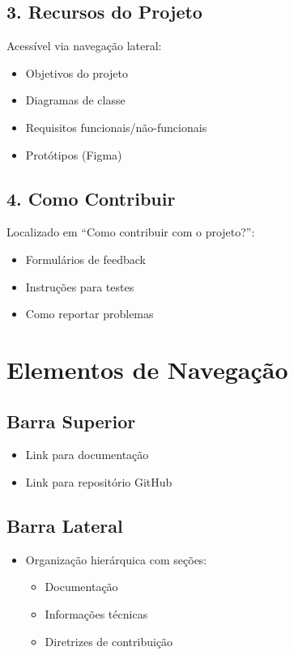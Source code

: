 \begin{itemize}
\begin{itemize}
\subsection{3. Recursos do Projeto}
Acessível via navegação lateral:
\begin{itemize}
    \item Objetivos do projeto
    \item Diagramas de classe
    \item Requisitos funcionais/não-funcionais
    \item Protótipos (Figma)
\end{itemize}

\subsection{4. Como Contribuir}
Localizado em ``Como contribuir com o projeto?'':
\begin{itemize}
    \item Formulários de feedback
    \item Instruções para testes
    \item Como reportar problemas
\end{itemize}

\section{Elementos de Navegação}

\subsection{Barra Superior}
\begin{itemize}
    \item Link para documentação
    \item Link para repositório GitHub
\end{itemize}

\subsection{Barra Lateral}
\begin{itemize}
    \item Organização hierárquica com seções:
    \begin{itemize}
        \item Documentação
        \item Informações técnicas
        \item Diretrizes de contribuição
    \end{itemize}
\end{itemize}


\end{itemize}
\end{itemize}
